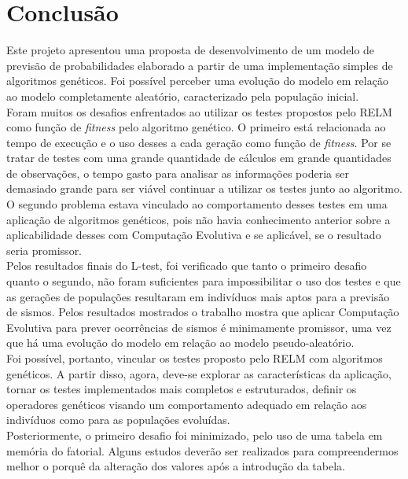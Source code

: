 \chapter{Conclusão}
Este projeto apresentou uma proposta de desenvolvimento de um modelo de previsão de probabilidades elaborado a partir de uma implementação simples de algoritmos genéticos. Foi possível perceber uma evolução do modelo em relação ao modelo completamente aleatório, caracterizado pela população inicial.\\

Foram muitos os desafios enfrentados ao utilizar os testes propostos pelo RELM como função de {\it fitness} pelo algoritmo genético. O primeiro está relacionada ao tempo de execução e o uso desses a cada geração como função de {\it fitness}. Por se tratar de testes com uma grande quantidade de cálculos em grande quantidades de observações, o tempo gasto para analisar as informações poderia ser demasiado grande para ser viável continuar a utilizar os testes junto ao algoritmo. O segundo problema estava vinculado ao comportamento desses testes em uma aplicação de algoritmos genéticos, pois não havia conhecimento anterior sobre a aplicabilidade desses com Computação Evolutiva e se aplicável, se o resultado seria promissor.\\

Pelos resultados finais do L-test, foi verificado que tanto o primeiro desafio quanto o segundo, não foram suficientes para impossibilitar o uso dos testes e que as gerações de populações resultaram em indivíduos mais aptos para a previsão de sismos. Pelos resultados mostrados o trabalho mostra que aplicar Computação Evolutiva para prever ocorrências de sismos é minimamente promissor, uma vez que há uma evolução do modelo em relação ao modelo pseudo-aleatório.\\

Foi possível, portanto, vincular os testes proposto pelo RELM com algoritmos genéticos. A partir disso, agora, deve-se explorar as características da aplicação, tornar os testes implementados mais completos e estruturados, definir os operadores genéticos visando um comportamento adequado em relação aos indivíduos como para as populações evoluídas.\\

Posteriormente, o primeiro desafio foi minimizado, pelo uso de uma tabela em memória do fatorial. Alguns estudos deverão ser realizados para compreendermos melhor o porquê da alteração dos valores após a introdução da tabela.\\

